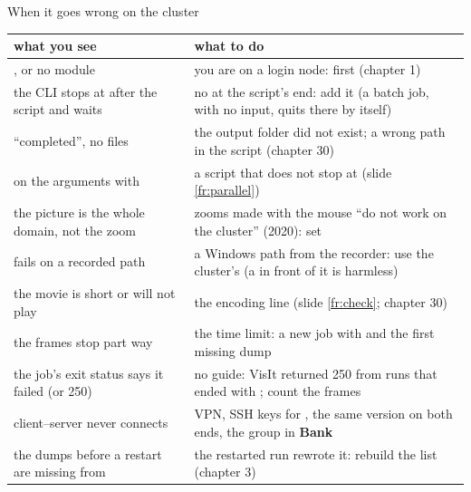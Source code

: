 \documentclass[aspectratio=169,11pt]{beamer}
\newcommand{\gui}[1]{\textsf{\textbf{#1}}}
\begin{document}
\begin{frame}{When it goes wrong on the cluster}
\label{fr:trouble}
\scriptsize
\begin{tabular}{@{}L{0.42\textwidth}L{0.53\textwidth}@{}}
\toprule
what you see & what to do \\
\midrule
{}, or no  module & you are on a login node:  first (chapter 1) \\
the CLI stops at \code{>>>} after the script and waits & no  at the script's end: add it (a batch job, with no input, quits there by itself) \\
``completed'', no files & the output folder did not exist; a wrong path in the script (chapter 30) \\
 on the arguments with  & a script that does not stop at  (slide \ref{fr:parallel}) \\
the picture is the whole domain, not the zoom & zooms made with the mouse ``do not work on the cluster'' (2020): set  \\
 fails on a recorded path & a Windows path from the recorder: use the cluster's (a  in front of it is harmless) \\
the movie is short or will not play & the encoding line (slide \ref{fr:check}; chapter 30) \\
the frames stop part way & the time limit: a new job with  and  the first missing dump \\
the job's exit status says it failed (or 250) & no guide: VisIt returned 250 from runs that ended with ; count the frames \\
client--server never connects & VPN, SSH keys for , the same version on both ends, the group in \gui{Bank} \\
the dumps before a restart are missing from  & the restarted run rewrote it: rebuild the list (chapter 3) \\
\bottomrule
\end{tabular}
\end{frame}
\end{document}
